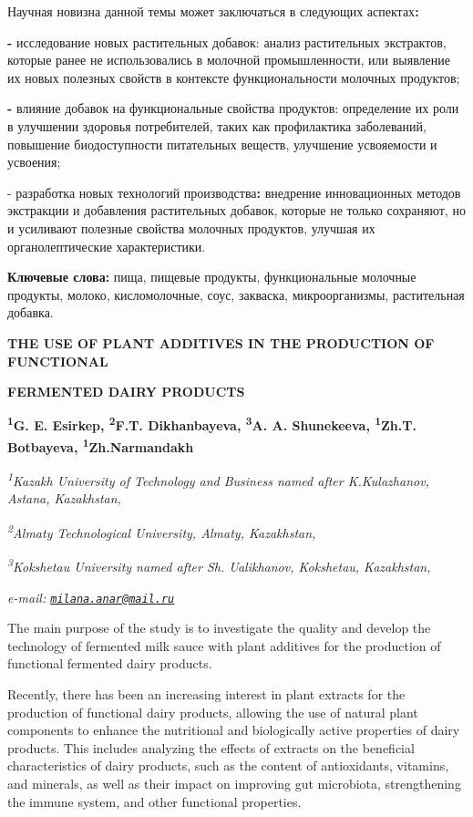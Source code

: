 {Научная новизна данной темы может заключаться в следующих
аспектах{\bfseries :}

{\bfseries -} исследование новых растительных добавок: анализ растительных
экстрактов, которые ранее не использовались в молочной промышленности,
или выявление их новых полезных свойств в контексте функциональности
молочных продуктов;

{\bfseries -} влияние добавок на функциональные свойства продуктов:
определение их роли в улучшении здоровья потребителей, таких как
профилактика заболеваний, повышение биодоступности питательных веществ,
улучшение усвояемости и усвоения;

- разработка новых технологий производства{\bfseries :} внедрение
инновационных методов экстракции и добавления растительных добавок,
которые не только сохраняют, но и усиливают полезные свойства молочных
продуктов, улучшая их органолептические характеристики.

{\bfseries Ключевые слова:} пища, пищевые продукты, функциональные молочные
продукты, молоко, кисломолочные, соус, закваска, микроорганизмы,
растительная добавка.

{\bfseries THE USE OF PLANT ADDITIVES IN THE PRODUCTION OF FUNCTIONAL}

{\bfseries FERMENTED DAIRY PRODUCTS}

{\bfseries \textsuperscript{1}G. E. Esirkep\textsuperscript{\envelope },
\textsuperscript{2}F.T. Dikhanbayeva, \textsuperscript{3}A. A.
Shunekeeva, \textsuperscript{1}Zh.T. Botbayeva,
\textsuperscript{1}Zh.Narmandakh}

\emph{\textsuperscript{1}Kazakh University of Technology and Business
named after K.Kulazhanov, Astana, Kazakhstan,}

\emph{\textsuperscript{2}Almaty Technological University, Almaty,
Kazakhstan,}

\emph{\textsuperscript{3}Kokshetau University named after Sh.
Ualikhanov, Kokshetau, Kazakhstan,}

\emph{e-mail:
\href{mailto:milana.anar@mail.ru}{\nolinkurl{milana.anar@mail.ru}}}

The main purpose of the study is to investigate the quality and develop
the technology of fermented milk sauce with plant additives for the
production of functional fermented dairy products.

Recently, there has been an increasing interest in plant extracts for
the production of functional dairy products, allowing the use of natural
plant components to enhance the nutritional and biologically active
properties of dairy products. This includes analyzing the effects of
extracts on the beneficial characteristics of dairy products, such as
the content of antioxidants, vitamins, and minerals, as well as their
impact on improving gut microbiota, strengthening the immune system, and
other functional properties.

}
